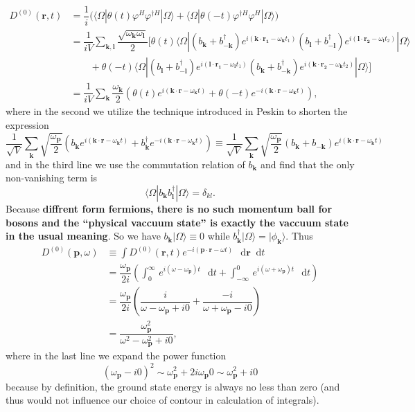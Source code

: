 \documentclass[b5paper,10pt,UTF8]{book}
\newcommand*\dd{\mathop{}\!\mathrm{d}}
\numberwithin{equation}{section}
\begin{document}
			\begin{Proof}
				\begin{align*}
					D^{(0)}(\bm{r},t)&=\dfrac{1}{i}\bigg(\langle\Omega|\theta(t)\varphi^H\varphi^{\dagger H}|\Omega\rangle+\langle\Omega|\theta(-t)\varphi^{\dagger H}\varphi^H|\Omega\rangle\bigg)\\
					&=\dfrac{1}{iV}\sum_{\bm{k,l}}\dfrac{\sqrt{\omega_{\bm k}\omega_{\bm l}}}{2}\bigg[\theta(t)\langle\Omega|\left(b_{\bm k}+b_{-\bm k}^\dagger\right)e^{i(\bm{k\cdot r_1}-\omega_{\bm k}t_1)}\left(b_{\bm l}+b_{-\bm l}^\dagger\right)e^{i(\bm{l\cdot r_2}-\omega_{\bm l}t_2)}|\Omega\rangle\\
					&\qquad+\theta(-t)\langle\Omega|\left(b_{\bm l}+b_{-\bm l}^\dagger\right)e^{i(\bm{l\cdot r_1}-\omega_{\bm l}t_1)}\left(b_{\bm k}+b_{-\bm k}^\dagger\right)e^{i(\bm{k\cdot r_2}-\omega_{\bm k}t_2)}|\Omega\rangle\bigg]\\
					&=\dfrac{1}{iV}\sum_{\bm{k}}\dfrac{\omega_{\bm k}}{2}\left(\theta(t)e^{i(\bm{k\cdot r}-\omega_{\bm k}t)}+\theta(-t)e^{-i(\bm{k\cdot r}-\omega_{\bm k}t)}\right),
				\end{align*}
				where in the second we utilize the technique introduced in Peskin to shorten the expression
				$$\dfrac{1}{\sqrt{V}}\sum_{\bm{k}}\sqrt{\dfrac{\omega_{\bm p}}{2}}\left(b_{\bm k}e^{i(\bm{k\cdot r}-\omega_{\bm k}t)}+b_{\bm k}^\dagger e^{-i(\bm{k\cdot r}-\omega_{\bm k}t)}\right)\equiv\dfrac{1}{\sqrt{V}}\sum_{\bm{k}}\sqrt{\dfrac{\omega_{\bm p}}{2}}\left(b_{\bm k}+b_{-\bm k}\right)e^{i(\bm{k\cdot r}-\omega_{\bm k}t)}$$
				and in the third line we use the commutation relation of $b_{\bm k}$ and find that the only non-vanishing term is
				$$\langle\Omega|b_{\bm k}b_{\bm l}^\dagger|\Omega\rangle=\delta_{kl}.$$
				Because \textbf{diffrent form fermions, there is no such momentum ball for bosons and the ``physical vaccuum state'' is exactly the vaccuum state in the usual meaning}. So we have $b_{\bm{k}}|\Omega\rangle\equiv0$ while $b_{\bm{k}}^\dagger|\Omega\rangle=|\phi_{\bm{k}}\rangle$. Thus
				\begin{align*}
					D^{(0)}(\bm{p},\omega)&\equiv\int D^{(0)}(\bm{r},t)e^{-i(\bm{p\cdot r}-\omega t)}\,\dd\bm r\dd t\\
					&=\dfrac{\omega_{\bm p}}{2i}\left(\int_0^\infty\,e^{i(\omega-\omega_{\bm p})t}\,\dd t+\int_{-\infty}^0\,e^{i(\omega+\omega_{\bm p})t}\,\dd t\right)\\
					&=\dfrac{\omega_{\bm p}}{2i}\left(\dfrac{i}{\omega-\omega_{\bm p}+i0}+\dfrac{-i}{\omega+\omega_{\bm p}-i0}\right)\\
					&=\dfrac{\omega_{\bm p}^2}{\omega^2-\omega_{\bm p}^2+i0},
				\end{align*}
				where in the last line we expand the power function
				$$(\omega_{\bm p}-i0)^2\sim\omega_{\bm p}^2+2i\omega_{\bm p}0\sim\omega_{\bm p}^2+i0$$
				because by definition, the ground state energy is always no less than zero (and thus would not influence our choice of contour in calculation of integrals).
			\end{Proof}
\end{document}
